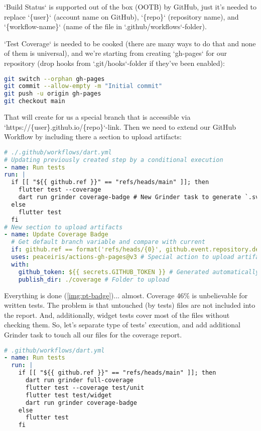 `Build Status` is supported out of the box (OOTB) by GitHub, just it's needed to replace `\{user\}` (account name
on GitHub), `\{repo\}` (repository name), and `\{workflow-name\}` (name of the file in `.github/workflows`-folder).

`Test Coverage` is needed to be cooked (there are many ways to do that and none of them is universal), and we're 
starting from creating `gh-pages` for our repository (drop hooks from `.git/hooks`-folder if they've been enabled):

\begin{lstlisting}[language=bash]
git switch --orphan gh-pages
git commit --allow-empty -m "Initial commit"
git push -u origin gh-pages
git checkout main
\end{lstlisting}

\noindent That will create for us a special branch that is accessible via `https://\{user\}.github.io/\{repo\}`-link. 
Then we need to extend our GitHub Workflow by including there a section to upload artifacts:

\begin{lstlisting}[language=yaml]
# ./.github/workflows/dart.yml
# Updating previously created step by a conditional execution
- name: Run tests
run: |
  if [[ "${{ github.ref }}" == "refs/heads/main" ]]; then
    flutter test --coverage
    dart run grinder coverage-badge # New Grinder task to generate `.svg'-file with coverage
  else
    flutter test
  fi
# New section to upload artifacts
- name: Update Coverage Badge
  # Get default branch variable and compare with current
  if: github.ref == format('refs/heads/{0}', github.event.repository.default_branch)
  uses: peaceiris/actions-gh-pages@v3 # Special action to upload artifacts
  with:
    github_token: ${{ secrets.GITHUB_TOKEN }} # Generated automatically by GitHub
    publish_dir: ./coverage # Folder to upload
\end{lstlisting}


Everything is done (\cref{img:pt-badge})... almost. Coverage 46\% is unbelievable for written tests. The problem is that
untouched (by tests) files are not included into the report. And, additionally, widget tests cover most of the 
files without checking them. So, let's separate type of tests' execution, and add additional Grinder task to touch all 
our files for the coverage report.

\begin{lstlisting}[language=yaml]
# .github/workflows/dart.yml
- name: Run tests
  run: |
    if [[ "${{ github.ref }}" == "refs/heads/main" ]]; then
      dart run grinder full-coverage
      flutter test --coverage test/unit
      flutter test test/widget
      dart run grinder coverage-badge
    else
      flutter test
    fi
\end{lstlisting}

